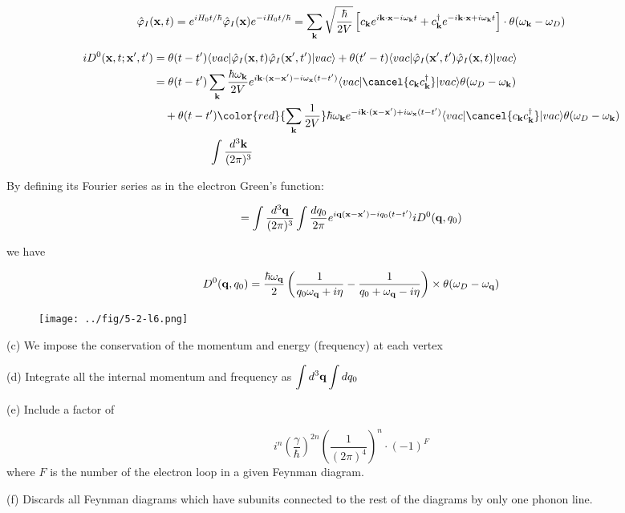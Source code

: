 \[\hat\varphi_I({\bf x},t) = e^{iH_0t/\hbar}\hat\varphi_I({\bf x})e^{-iH_0t/\hbar} = \sum_{\bf k}\sqrt{\frac{\hbar}{2V}}\left[c_{\bf k}e^{i{\bf k\cdot x} - i\omega_{\bf k}t} + c_{\bf k}^\dagger e^{-i{\bf k\cdot x} + i\omega_{\bf k}t}\right] \cdot\theta(\omega_{\bf k} - \omega_D)\]

\[\begin{split}
iD^0({\bf x},t;{\bf x'},t') &= \theta(t-t')\langle vac|\hat\varphi_I({\bf x},t)\hat\varphi_I({\bf x'},t')|vac\rangle + \theta(t'-t)\langle vac|\hat\varphi_I({\bf x'},t')\hat\varphi_I({\bf x},t)|vac\rangle\\
&= \theta(t-t')\sum_{\bf k}\frac{\hbar\omega_{\bf k}}{2V}e^{i{\bf k\cdot(x-x')}-i\omega_{\bf x}(t-t')}\langle vac|\cancel{c_{\bf k}c_{\bf k}^\dagger}|vac\rangle\theta(\omega_D-\omega_{\bf k})\\
&\ \ \  + \theta(t-t'){\color{red}{\sum_{\bf k}\frac{1}{2V}}}\hbar\omega_{\bf k}e^{-i{\bf k\cdot(x-x')}+i\omega_{\bf x}(t-t')}\langle vac|\cancel{c_{\bf k}c_{\bf k}^\dagger}|vac\rangle\theta(\omega_D-\omega_{\bf k})\\
&\quad\quad\quad\quad\quad\int \frac{d^3\bf k}{(2\pi)^3}\\
\end{split} \]

By defining its Fourier series as in the electron Green's function:

\[=\int \frac{d^3\bf q}{(2\pi)^3}\int \frac{d q_0}{2\pi}e^{i{\bf q(x-x')}-iq_0(t-t')}iD^0({\bf q},q_0) \]

we have

\[D^0({\bf q},q_0)=\frac{\hbar\omega_{\bf q}}{2}\left(\frac{1}{q_0\omega_{\bf q}+i\eta}-\frac{1}{q_0+\omega_{\bf q}-i\eta}\right)\times\theta(\omega_D-\omega_{\bf q}) \]

\begin{wrapfigure}{l}{3cm}
\texttt{[image: ../fig/5-2-l6.png]}
\end{wrapfigure}
\noindent (c) We impose the conservation of the momentum and energy (frequency) at each vertex

\noindent (d) Integrate all the internal momentum and frequency as $\displaystyle\int d^3{\bf q}\int dq_0$

\noindent (e) Include a factor of

\[i^n\left(\frac{\gamma}{\hbar}\right)^{2n}\left(\frac{1}{(2\pi)^4}\right)^n\cdot(-1)^F \]
where $F$ is the number of the electron loop in a given Feynman diagram.

\noindent (f) Discards all Feynman diagrams which have subunits connected to the rest of the diagrams by only one phonon line.

